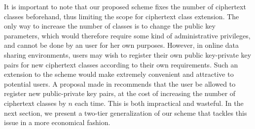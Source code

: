 It is important to note that our proposed scheme fixes the number of ciphertext classes beforehand, thus limiting the scope for ciphertext class extension. The only way to increase the number of classes is to change the public key parameters, which would therefore require some kind of administrative privileges, and cannot be done by an user for her own purposes. However, in online data sharing environments, users may wish to register their own public key-private key pairs for new ciphertext classes according to their own requirements. Such an extension to the scheme would make extremely convenient and attractive to potential users. A proposal made in \cite{chu2014key} recommends that the user be allowed to register new public-private key pairs, at the cost of increasing the number of ciphertext classes by $n$ each time. This is both impractical and wasteful. In the next section, we present a two-tier generalization of our scheme that tackles this issue in a more economical fashion. 
  


